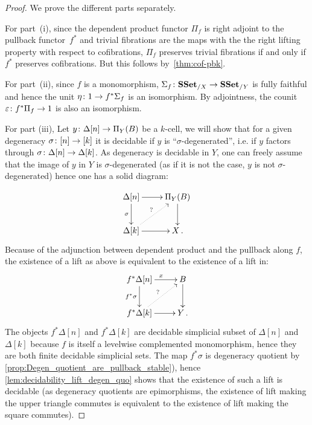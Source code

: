 \documentclass[reqno,10pt,a4paper,oneside,draft]{amsart}
\begin{document}
 
\begin{proof} We prove the different parts separately. 

For part~(i), since the dependent product functor $\Pi_f$ is right adjoint to the pullback functor~$f^*$ and trivial fibrations are the maps with the the right lifting property with respect to cofibrations, $\Pi_f$ preserves trivial fibrations if and only if $f^*$ preserves cofibrations. But this follows by~\cref{thm:cof-pbk}.

For part~(ii),  since $f$ is a monomorphism,  $\Sigma_f \colon \mathbf{SSet}_{/X} \rightarrow \mathbf{SSet}_{/Y}$ is fully faithful and hence the unit $\eta \colon 1 \rightarrow f^*  \Sigma_{f}$ is an isomorphism. By adjointness, the counit $\varepsilon \colon f^* \Pi_f \rightarrow 1$ is also an isomorphism. 

For part (iii), Let $y \colon  \Delta[n] \rightarrow \Pi_Y(B)$ be a  $k$-cell, we will show that for a given degeneracy $\sigma \colon [n] \rightarrow [k]$ it is decidable if $y$ is ``$\sigma$-degenerated'', i.e. if $y$ factors through $\sigma \colon \Delta[n] \rightarrow \Delta[k]$. As degeneracy is decidable in $Y$, one can freely assume that the image of $y$ in $Y$ is $\sigma$-degenerated (as if it is not the case, $y$ is not $\sigma$-degenerated) hence one has a solid diagram:

\[
\xymatrix{
\Delta[n] \ar[d]_{\sigma} \ar[r] & \Pi_Y(B) \ar[d] \\
\Delta[k] \ar@{.>}[ur]^? \ar[r] & X \, . \\
}
\]
Because of the adjunction between dependent product and the pullback along $f$, the existence of a lift as above is equivalent to the existence of a lift in:
\[
\xymatrix{
f^* \Delta[n] \ar[d]_{f^* \sigma} \ar[r]^x & B \ar[d] \\
f^* \Delta[k] \ar@{.>}[ur]^? \ar[r] & Y \, .  \\
}
\]
The objects $f^* \Delta[n]$ and $f^* \Delta[k]$ are decidable simplicial subset of $\Delta[n]$ and $\Delta[k]$ because $f$ is itself a levelwise complemented monomorphism, hence they are both finite decidable simplicial sets. The map $f^* \sigma$ is degeneracy quotient by \cref{prop:Degen_quotient_are_pullback_stable}), hence \cref{lem:decidability_lift_degen_quo} shows that the existence of such a lift is decidable (as degeneracy quotients are epimorphisms, the existence of lift making the upper triangle commutes is equivalent to the existence of lift making the square commutes).




\end{proof}
\end{document}
